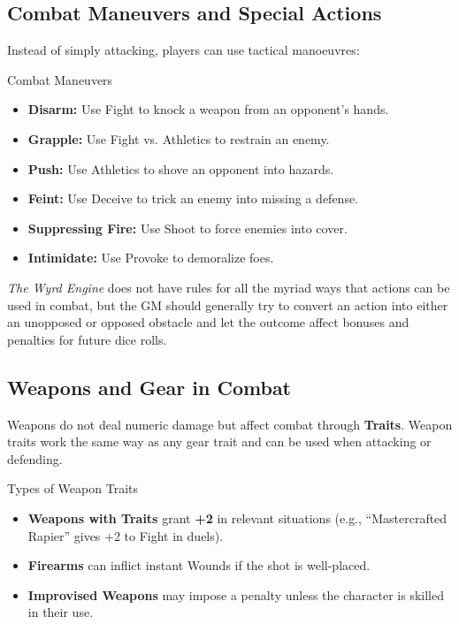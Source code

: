 \subsection{Combat Maneuvers and Special Actions}
Instead of simply attacking, players can use tactical manoeuvres:

\begin{DndReadAloud}{Combat Maneuvers}
\begin{itemize}
    \item \textbf{Disarm:} Use Fight to knock a weapon from an opponent’s hands.
    \item \textbf{Grapple:} Use Fight vs. Athletics to restrain an enemy.
    \item \textbf{Push:} Use Athletics to shove an opponent into hazards.
    \item \textbf{Feint:} Use Deceive to trick an enemy into missing a defense.
    \item \textbf{Suppressing Fire:} Use Shoot to force enemies into cover.
    \item \textbf{Intimidate:} Use Provoke to demoralize foes.
\end{itemize}
\end{DndReadAloud}

\emph{The Wyrd Engine} does not have rules for all the myriad ways that actions can be used in combat, but the GM should generally try to convert an action into either an unopposed or opposed obstacle and let the outcome affect bonuses and penalties for future dice rolls.

\subsection{Weapons and Gear in Combat}
Weapons do not deal numeric damage but affect combat through \textbf{Traits}. Weapon traits work the same way as any gear trait and can be used when attacking or defending.

\begin{DndReadAloud}{Types of Weapon Traits}
\begin{itemize}
    \item \textbf{Weapons with Traits} grant \textbf{+2} in relevant situations (e.g., “Mastercrafted Rapier” gives +2 to Fight in duels).
    \item \textbf{Firearms} can inflict instant Wounds if the shot is well-placed.
    \item \textbf{Improvised Weapons} may impose a penalty unless the character is skilled in their use.
\end{itemize}
\end{DndReadAloud}

